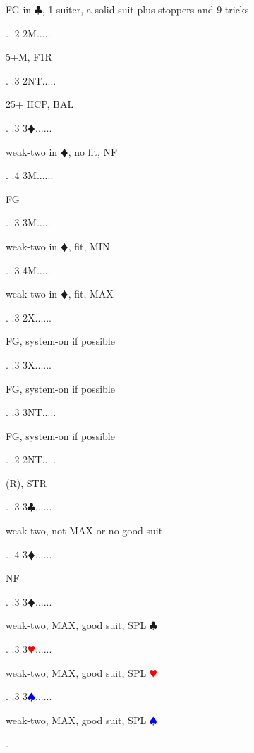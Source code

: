 \documentclass[a4paper]{article}
\newcommand{\BC}{\textcolor{OliveGreen}{$\clubsuit$}}
\newcommand{\BD}{\textcolor{RedOrange}{$\vardiamondsuit$}}
\newcommand{\BH}{\textcolor{Red}{$\varheartsuit${}}}
\newcommand{\BS}{\textcolor{Blue}{$\spadesuit${}}}
\begin{document}
{\begin{minipage}[t]{0.8\textwidth}
FG in \BC , 1-suiter, a solid suit plus stoppers and 9 tricks
\end{minipage}. 
 .2 2M......\begin{minipage}[t]{0.8\textwidth}
5+M, F1R
\end{minipage}. 
 .3 2NT.....\begin{minipage}[t]{0.8\textwidth}
25+ HCP, BAL
\end{minipage}. 
 .3 3\BD......\begin{minipage}[t]{0.8\textwidth}
weak-two in \BD , no fit, NF
\end{minipage}. 
 .4 3M......\begin{minipage}[t]{0.8\textwidth}
FG
\end{minipage}. 
 .3 3M......\begin{minipage}[t]{0.8\textwidth}
weak-two in \BD , fit, MIN
\end{minipage}. 
 .3 4M......\begin{minipage}[t]{0.8\textwidth}
weak-two in \BD , fit, MAX
\end{minipage}. 
 .3 2X......\begin{minipage}[t]{0.8\textwidth}
FG, system-on if possible
\end{minipage}. 
 .3 3X......\begin{minipage}[t]{0.8\textwidth}
FG, system-on if possible
\end{minipage}. 
 .3 3NT.....\begin{minipage}[t]{0.8\textwidth}
FG, system-on if possible
\end{minipage}. 
 .2 2NT.....\begin{minipage}[t]{0.8\textwidth}
(R), STR
\end{minipage}. 
 .3 3\BC......\begin{minipage}[t]{0.8\textwidth}
weak-two, not MAX or no good suit
\end{minipage}. 
 .4 3\BD......\begin{minipage}[t]{0.8\textwidth}
NF
\end{minipage}. 
 .3 3\BD......\begin{minipage}[t]{0.8\textwidth}
weak-two, MAX, good suit, SPL \BC 
\end{minipage}. 
 .3 3\BH......\begin{minipage}[t]{0.8\textwidth}
weak-two, MAX, good suit, SPL \BH 
\end{minipage}. 
 .3 3\BS......\begin{minipage}[t]{0.8\textwidth}
weak-two, MAX, good suit, SPL \BS 
\end{minipage}. 
}
\end{document}
